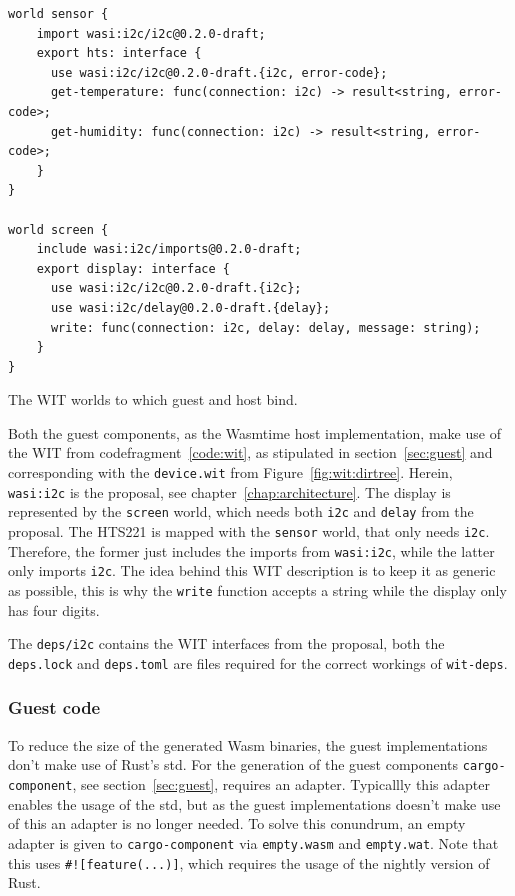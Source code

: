 \begin{listing}[h!]

\begin{verbatim}
world sensor {
    import wasi:i2c/i2c@0.2.0-draft;
    export hts: interface {
      use wasi:i2c/i2c@0.2.0-draft.{i2c, error-code};
      get-temperature: func(connection: i2c) -> result<string, error-code>;
      get-humidity: func(connection: i2c) -> result<string, error-code>;
    }
}

world screen {
    include wasi:i2c/imports@0.2.0-draft;
    export display: interface {
      use wasi:i2c/i2c@0.2.0-draft.{i2c};
      use wasi:i2c/delay@0.2.0-draft.{delay};
      write: func(connection: i2c, delay: delay, message: string);
    }
}
\end{verbatim}
\caption{The \gls{WIT} worlds to which guest and host bind.}
\label{code:wit}
\end{listing}

Both the guest components, as the Wasmtime host implementation, make use of the \gls{WIT} from codefragment~\ref{code:wit}, as stipulated in section~\ref{sec:guest} and corresponding with the \texttt{device.wit} from Figure~\ref{fig:wit:dirtree}. Herein, \texttt{wasi:i2c} is the proposal, see chapter~\ref{chap:architecture}. The display is represented by the \texttt{screen} world, which needs both \texttt{i2c} and \texttt{delay} from the proposal. The HTS221 is mapped with the \texttt{sensor} world, that only needs \texttt{i2c}. Therefore, the former just includes the imports from \texttt{wasi:i2c}, while the latter only imports \texttt{i2c}. The idea behind this WIT description is to keep it as generic as possible, this is why the \texttt{write} function accepts a string while the display only has four digits.

The \texttt{deps/i2c} contains the WIT interfaces from the proposal, both the \texttt{deps.lock} and \texttt{deps.toml} are files required for the correct workings of \texttt{wit-deps}.

\subsubsection{Guest code}

To reduce the size of the generated Wasm binaries, the guest implementations don't make use of Rust's std. For the generation of the guest components \texttt{cargo-component}, see section~\ref{sec:guest}, requires an adapter. Typicallly this adapter enables the usage of the std, but as the guest implementations doesn't make use of this an adapter is no longer needed. To solve this conundrum, an empty adapter is given to \texttt{cargo-component} via \texttt{empty.wasm} and \texttt{empty.wat}. Note that this uses \texttt{\#![feature(...)]}, which requires the usage of the nightly version of Rust.

